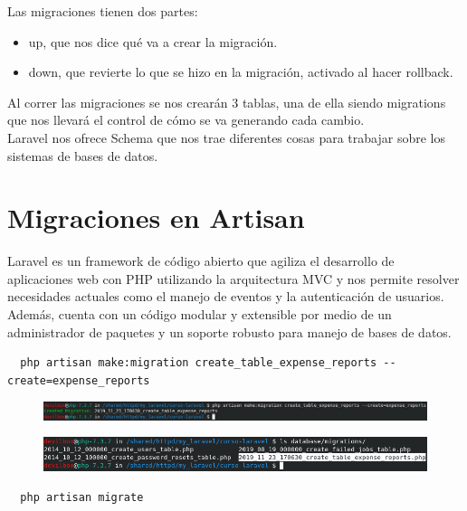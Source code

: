 \documentclass{article}
\begin{document}
Las migraciones tienen dos partes:

\begin{itemize}
  \item up, que nos dice qué va a crear la migración.
  \item down, que revierte lo que se hizo en la migración, activado al hacer
    rollback.
\end{itemize}

Al correr las migraciones se nos crearán 3 tablas, una de ella siendo
migrations que nos llevará el control de cómo se va generando cada cambio.\\

Laravel nos ofrece Schema que nos trae diferentes cosas para trabajar sobre los
sistemas de bases de datos.\\


\section{Migraciones en Artisan}%
Laravel es un framework de código abierto que agiliza el desarrollo de
aplicaciones web con PHP utilizando la arquitectura MVC y nos permite resolver
necesidades actuales como el manejo de eventos y la autenticación de usuarios.
Además, cuenta con un código modular y extensible por medio de un administrador
de paquetes y un soporte robusto para manejo de bases de datos.\\


\begin{verbatim}
  php artisan make:migration create_table_expense_reports --create=expense_reports
\end{verbatim}

\begin{figure}[h!]
  \centering
  \includegraphics[scale=0.5]{./Pictures/026_create_table_artisan.png}
\end{figure}

\begin{figure}[h!]
  \centering
  \includegraphics[scale=0.5]{./Pictures/027_migration_file.png}
\end{figure}


\begin{verbatim}
  php artisan migrate
\end{verbatim}
\end{document}
